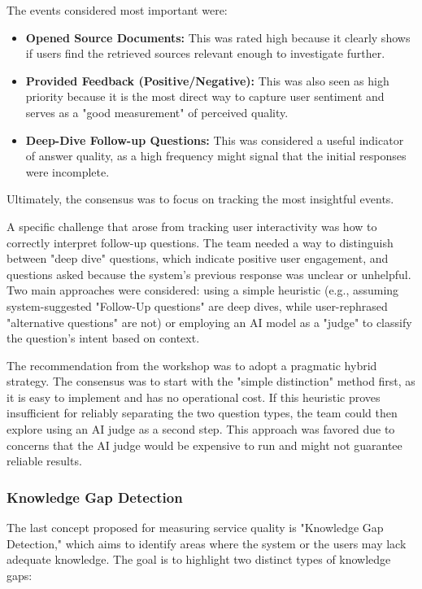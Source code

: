 \documentclass[
	english,
	ruledheaders=section,%
	class=report,%
	thesis={type=bachelor},%
	accentcolor=1b,%
	custommargins=true,%
	marginpar=false,%
	parskip=half-,%
	fontsize=11pt,%
	DIV=14,
]{tudapub}
\begin{document}
The events considered most important were:
\begin{itemize}
    \item \textbf{Opened Source Documents:} This was rated high because it clearly shows if users find the retrieved sources relevant enough to investigate further.
    \item \textbf{Provided Feedback (Positive/Negative):} This was also seen as high priority because it is the most direct way to capture user sentiment and serves as a "good measurement" of perceived quality.
    \item \textbf{Deep-Dive Follow-up Questions:} This was considered a useful indicator of answer quality, as a high frequency might signal that the initial responses were incomplete.
\end{itemize}
Ultimately, the consensus was to focus on tracking the most insightful events.

A specific challenge that arose from tracking user interactivity was how to correctly interpret follow-up questions. The team needed a way to distinguish between "deep dive" questions, which indicate positive user engagement, and questions asked because the system's previous response was unclear or unhelpful. Two main approaches were considered: using a simple heuristic (e.g., assuming system-suggested "Follow-Up questions" are deep dives, while user-rephrased "alternative questions" are not) or employing an AI model as a "judge" to classify the question's intent based on context.

The recommendation from the workshop was to adopt a pragmatic hybrid strategy. The consensus was to start with the "simple distinction" method first, as it is easy to implement and has no operational cost. If this heuristic proves insufficient for reliably separating the two question types, the team could then explore using an AI judge as a second step. This approach was favored due to concerns that the AI judge would be expensive to run and might not guarantee reliable results.

\subsubsection{Knowledge Gap Detection}
The last concept proposed for measuring service quality \parencite[p.~18]{DeloneMcLean2003ISSuccessTenYearUpdate} is "Knowledge Gap Detection," which aims to identify areas where the system or the users may lack adequate knowledge. The goal is to highlight two distinct types of knowledge gaps:
\end{document}
